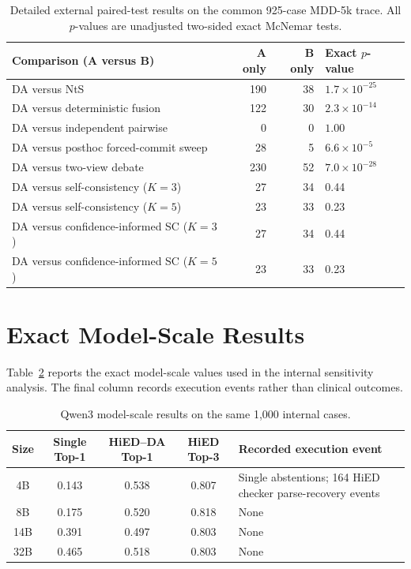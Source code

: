 \begin{table}[htbp]
\centering
\caption{Detailed external paired-test results on the common 925-case MDD-5k trace. All $p$-values are unadjusted two-sided exact McNemar tests.}
\label{tab:external-paired-tests}
\footnotesize
\renewcommand{\arraystretch}{1.08}
\begin{tabularx}{\textwidth}{|>{\raggedright\arraybackslash}X|r|r|p{3.0cm}|}
\hline
Comparison (A versus B) & A only & B only & Exact $p$-value\\
\hline
DA versus NtS & 190 & 38 & $1.7\times10^{-25}$\\
\hline
DA versus deterministic fusion & 122 & 30 & $2.3\times10^{-14}$\\
\hline
DA versus independent pairwise & 0 & 0 & $1.00$\\
\hline
DA versus posthoc forced-commit sweep & 28 & 5 & $6.6\times10^{-5}$\\
\hline
DA versus two-view debate & 230 & 52 & $7.0\times10^{-28}$\\
\hline
DA versus self-consistency ($K=3$) & 27 & 34 & 0.44\\
\hline
DA versus self-consistency ($K=5$) & 23 & 33 & 0.23\\
\hline
DA versus confidence-informed SC ($K=3$) & 27 & 34 & 0.44\\
\hline
DA versus confidence-informed SC ($K=5$) & 23 & 33 & 0.23\\
\hline
\end{tabularx}
\renewcommand{\arraystretch}{1.0}
\end{table}

\section{Exact Model-Scale Results}

Table~\ref{tab:qwen-size-results} reports the exact model-scale values used in the internal sensitivity analysis. The final column records execution events rather than clinical outcomes.

\begin{table}[H]
\centering
\caption{Qwen3 model-scale results on the same 1,000 internal cases.}
\label{tab:qwen-size-results}
\small
\renewcommand{\arraystretch}{1.10}
\begin{tabularx}{\textwidth}{|c|c|c|c|>{\raggedright\arraybackslash}X|}
\hline
Size & Single Top-1 & HiED--DA Top-1 & HiED Top-3 & Recorded execution event\\
\hline
4B & 0.143 & 0.538 & 0.807 & 17 Single abstentions; 164 HiED checker parse-recovery events\\
\hline
8B & 0.175 & 0.520 & 0.818 & None\\
\hline
14B & 0.391 & 0.497 & 0.803 & None\\
\hline
32B & 0.465 & 0.518 & 0.803 & None\\
\hline
\end{tabularx}
\renewcommand{\arraystretch}{1.0}
\end{table}
